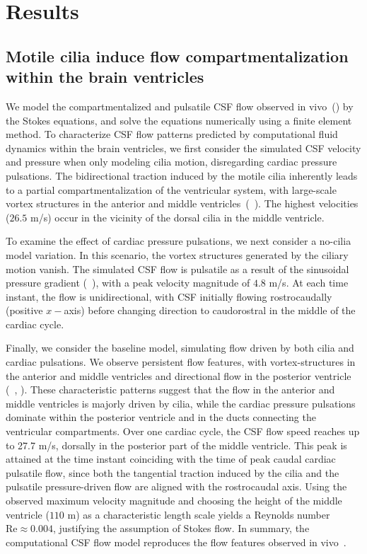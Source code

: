 \documentclass{WileyMSP-template}
\begin{document}
\section{Results}
\subsection{Motile cilia induce flow compartmentalization within the brain ventricles}

We model the compartmentalized and pulsatile CSF flow observed in vivo~()
by the Stokes equations, and solve the equations numerically using a finite element method.
To characterize CSF flow patterns predicted by
computational fluid dynamics within the brain ventricles, we first
consider the simulated CSF velocity and pressure when only modeling
cilia motion, disregarding cardiac pressure pulsations. The
bidirectional traction induced by the motile cilia
inherently leads to a partial compartmentalization of the ventricular
system, with large-scale vortex structures in the anterior and middle
ventricles~(~). The highest velocities ($26.5$ \textmu m/s)
occur in the vicinity of the dorsal cilia in the middle ventricle. 

To examine the effect of cardiac pressure pulsations,
we next consider a no-cilia model variation. In this scenario, the vortex structures
generated by the ciliary motion vanish. The simulated CSF
flow is pulsatile as a result of the sinusoidal pressure gradient (~),
with a peak velocity magnitude of $4.8$ \textmu m/s. At each time instant, the flow
is unidirectional, with CSF initially flowing rostrocaudally (positive $x-$axis) before changing
direction to caudorostral in the middle of the cardiac cycle.

Finally, we consider the baseline model, simulating flow driven by both cilia
and cardiac pulsations. We observe persistent flow features,
with vortex-structures in the anterior and middle ventricles
and directional flow in the posterior ventricle (~,
). These characteristic patterns suggest
that the flow in the anterior and middle ventricles is majorly driven
by cilia, while the cardiac pressure pulsations dominate
within the posterior ventricle and in the ducts connecting the ventricular
compartments. Over one cardiac cycle, the CSF flow
speed reaches up to 27.7 \textmu m/s, dorsally in the posterior part
of the middle ventricle. This peak is attained at the time instant
coinciding with the time of peak caudal cardiac pulsatile flow, since 
both the tangential traction induced by the cilia and the pulsatile
pressure-driven flow are aligned with the rostrocaudal 
axis. Using the observed maximum velocity magnitude and choosing the height of
the middle ventricle ($110$ \textmu m) as a characteristic length
scale yields a Reynolds number $\mathrm{Re} \approx 0.004$,
justifying the assumption of Stokes flow. In summary, the computational
CSF flow model reproduces the flow features observed
in vivo~\cite{Olstad2019CiliaryDevelopment}.
\end{document}
